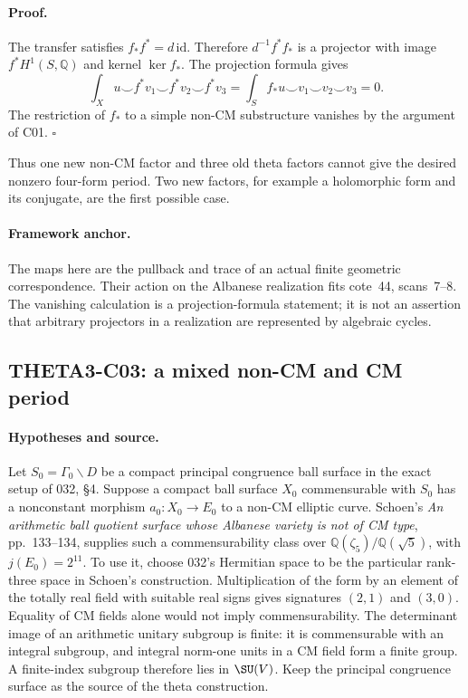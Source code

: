 \documentclass[11pt]{article}
\newcommand{\Q}{\mathbb Q}\newcommand{\C}{\mathbb C}\newcommand{\Z}{\mathbb Z}\newcommand{\R}{\mathbb R}\newcommand{\A}{\mathbb A}\newcommand{\OO}{\mathcal O}
\theoremstyle{definition}\newtheorem{definition}[theorem]{Definition}\newtheorem{remark}[theorem]{Remark}
\begin{document}
\paragraph{Proof.}
The transfer satisfies $f_*f^*=d\,\mathrm{id}$. Therefore
$d^{-1}f^*f_*$ is a projector with image $f^*H^1(S,\Q)$ and kernel
$\ker f_*$. The projection formula gives
\[
 \int_Xu\smile f^*v_1\smile f^*v_2\smile f^*v_3
 =\int_S f_*u\smile v_1\smile v_2\smile v_3=0.
\]
The restriction of $f_*$ to a simple non-CM substructure vanishes by
the argument of C01. $\square$

Thus one new non-CM factor and three old theta factors cannot give
the desired nonzero four-form period. Two new factors, for example a
holomorphic form and its conjugate, are the first possible case.

\paragraph{Framework anchor.}
The maps here are the pullback and trace of an actual finite geometric
correspondence.  Their action on the Albanese realization fits cote~44,
scans~7--8.  The vanishing calculation is a projection-formula statement;
it is not an assertion that arbitrary projectors in a realization are
represented by algebraic cycles.

\subsection{THETA3-C03: a mixed non-CM and CM period}\label{C03}

\paragraph{Hypotheses and source.}
Let $S_0=\Gamma_0\backslash D$ be a compact principal congruence
ball surface in the exact setup of 032, \S4. Suppose a compact ball
surface $X_0$ commensurable with $S_0$ has a nonconstant morphism
$a_0:X_0\to E_0$ to a non-CM elliptic curve.
Schoen's \emph{An arithmetic ball quotient surface whose Albanese
variety is not of CM type}, pp.~133--134, supplies such a
commensurability class over $\Q(\zeta_5)/\Q(\sqrt5)$, with
$j(E_0)=2^{11}$. To use it, choose 032's Hermitian space to be the
particular rank-three space in Schoen's construction. Multiplication
of the form by an element of the totally real field with suitable
real signs gives signatures $(2,1)$ and $(3,0)$. Equality of CM
fields alone would not imply commensurability. The determinant image
of an arithmetic unitary subgroup is finite: it is commensurable
with an integral subgroup, and integral norm-one units in a CM field
form a finite group. A finite-index subgroup therefore lies in
$\SU(V)$. Keep the principal congruence surface as the source of the
theta construction.
\end{document}
